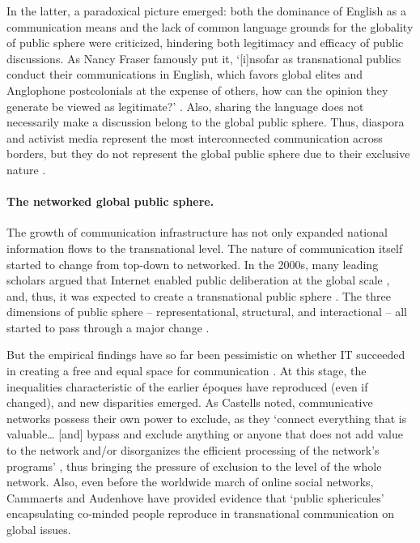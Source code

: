 In the latter, a paradoxical picture emerged: both the dominance of English as a communication means and the lack of common language grounds for the globality of public sphere were criticized, hindering both legitimacy and efficacy of public discussions. As Nancy Fraser famously put it, ‘[i]nsofar as transnational publics conduct their communications in English, which favors global elites and Anglophone postcolonials at the expense of others, how can the opinion they generate be viewed as legitimate?’ \cite[p.~18]{Fraser2014}. Also, sharing the language does not necessarily make a discussion belong to the global public sphere. Thus, diaspora and activist media represent the most interconnected communication across borders, but they do not represent the global public sphere due to their exclusive nature \cite{Sparks2005,Volkmer}.

\paragraph{The networked global public sphere.} The growth of communication infrastructure has not only expanded national information flows to the transnational level. The nature of communication itself started to change from top-down to networked. In the 2000s, many leading scholars argued that Internet enabled public deliberation at the global scale \cite{Bohman}, and, thus, it was expected to create a transnational public sphere \cite{WodakWright}. The three dimensions of public sphere -- representational, structural, and interactional \cite{Dahlgren2005} -- all started to pass through a major change \cite{BatorskiGrzywinska}.

But the empirical findings have so far been pessimistic on whether IT succeeded in creating a free and equal space for communication \cite{CammaertsAudenhove,Papacharissi2008}. At this stage, the inequalities characteristic of the earlier époques have reproduced (even if changed), and new disparities emerged. As Castells noted, communicative networks possess their own power to exclude, as they ‘connect everything that is valuable… [and] bypass and exclude anything or anyone that does not add value to the network and/or disorganizes the efficient processing of the network’s programs’ \cite[p.~81]{Castells2008}, thus bringing the pressure of exclusion to the level of the whole network. Also, even before the worldwide march of online social networks, Cammaerts and Audenhove \cite{CammaertsAudenhove} have provided evidence that ‘public sphericules’ \cite{Gitlin} encapsulating co-minded people reproduce in transnational communication on global issues.


